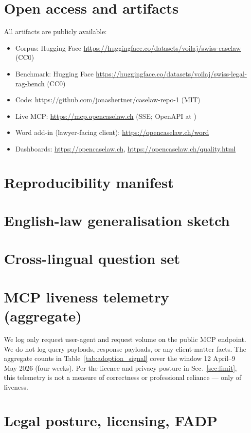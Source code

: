 \documentclass[11pt,a4paper]{article}
\begin{document}
\section{Open access and artifacts}\label{sec:open}

All artifacts are publicly available:
\begin{itemize}
\item Corpus: Hugging Face \url{https://huggingface.co/datasets/voilaj/swiss-caselaw} (CC0)
\item Benchmark: Hugging Face \url{https://huggingface.co/datasets/voilaj/swiss-legal-rag-bench} (CC0)
\item Code: \url{https://github.com/jonashertner/caselaw-repo-1} (MIT)
\item Live MCP: \url{https://mcp.opencaselaw.ch} (SSE; OpenAPI at )
\item Word add-in (lawyer-facing client): \url{https://opencaselaw.ch/word}
\item Dashboards: \url{https://opencaselaw.ch}, \url{https://opencaselaw.ch/quality.html}
\end{itemize}




\appendix
\section{Reproducibility manifest}\label{app:repro}


\section{English-law generalisation sketch}\label{app:english}


\section{Cross-lingual question set}\label{app:questions}


\section{MCP liveness telemetry (aggregate)}\label{app:adoption}
We log only request user-agent and request volume on the public MCP endpoint. We do not log query payloads, response payloads, or any client-matter facts. The aggregate counts in Table~\ref{tab:adoption_signal} cover the window 12 April--9 May 2026 (four weeks). Per the licence and privacy posture in Sec.~\ref{sec:limit}, this telemetry is not a measure of correctness or professional reliance --- only of liveness.


\section{Legal posture, licensing, FADP}\label{app:licensing}

\end{document}
